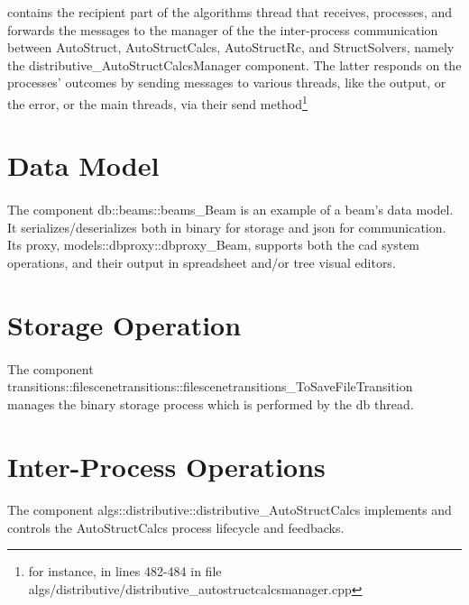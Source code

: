 contains the recipient part of the algorithms thread that receives, processes, and forwards the messages to the manager of the the inter-process communication between AutoStruct, AutoStructCalcs, AutoStructRc, and StructSolvers, namely the distributive\_AutoStructCalcsManager component. The latter responds on the processes' outcomes by sending messages to various threads, like the output, or the error, or the main threads, via their send method\footnote{for instance, in lines 482-484 in file algs/distributive/distributive\_autostructcalcsmanager.cpp}
\section{Data Model}
\paragraph{}
The component db::beams::beams\_Beam is an example of a beam's data model. It serializes/deserializes both in binary for storage and json for communication. Its proxy, models::dbproxy::dbproxy\_Beam, supports both the cad system operations, and their output in spreadsheet and/or tree visual editors.
\section{Storage Operation}
\paragraph{}
The component transitions::filescenetransitions::filescenetransitions\_ToSaveFileTransition manages the binary storage process which is performed by the db thread.
\section{Inter-Process Operations}
\paragraph{}
The component algs::distributive::distributive\_AutoStructCalcs implements and controls the AutoStructCalcs process lifecycle and feedbacks.
